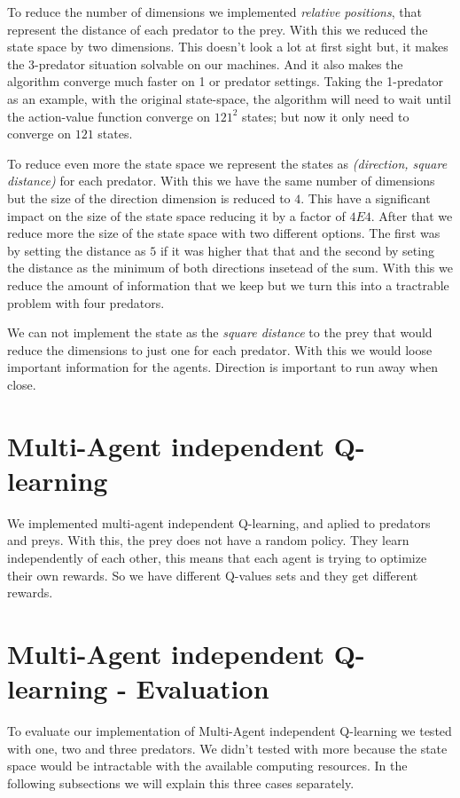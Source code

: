 \documentclass{article}
\begin{document}
To reduce the number of dimensions we implemented \emph{relative positions},
that represent the distance of each predator to the prey. With this we reduced the
state space by two dimensions. This doesn't look a lot at first sight but, it
makes the 3-predator situation solvable on our machines. And it also makes the
algorithm converge much faster on 1 or predator settings. Taking the 1-predator
as an example, with the original state-space, the algorithm will need to wait
until the action-value function converge on $121^2$ states; but now it only
need to converge on $121$ states.

To reduce even more the state space we represent the states as
\emph{(direction, square distance)} for each predator. With this we have the
same number of dimensions but the size of the direction dimension is reduced to $4$.
This have a significant impact on the size of the state space reducing it
by a factor of $4E4$. After that we reduce more the size of the state space with
two different options. The first was by setting the distance as $5$ if it was
higher that that and the second by seting the distance as the minimum of both
directions insetead of the sum.
With this we reduce the amount of information that we keep but we turn this into
a tractrable problem with four predators.

We can not implement the state as the \emph{square distance} to the prey that
would reduce the dimensions to just one for each predator. With this we would
loose important information for the agents. Direction is important to run away
when close.

\section{Multi-Agent independent Q-learning}
We implemented multi-agent independent Q-learning, and aplied to predators and
preys. With this, the prey does not have a random policy. They learn
independently of each other, this means that each agent is trying to optimize
their own rewards. So we have different Q-values sets and they get different
rewards.

\section{Multi-Agent independent Q-learning - Evaluation}
To evaluate our implementation of Multi-Agent independent Q-learning we tested
with one, two and three predators. We didn't tested with more because the state
space would be intractable with the available computing resources. In the
following subsections we will explain this three cases separately.
\end{document}
